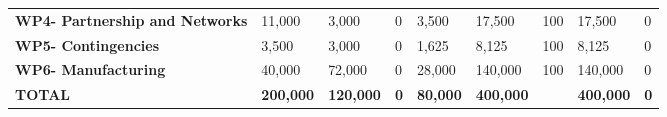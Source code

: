 \begin{table}[H]
{\begin{tabular}{p{5cm}p{2cm}p{2cm}p{2.5cm}p{2cm}p{2cm}p{2cm}p{2cm}p{2cm}}
\textbf{WP4- Partnership and Networks} & 11,000                                                                 & 3,000                                                              & 0                                                                               & 3,500                                                                        & 17,500                                                                                        & 100                          & 17,500                          & 0                                                                         \\
\textbf{WP5- Contingencies}                                                        & 3,500                                                                  & 3,000                                                              & 0                                                                               & 1,625                                                                        & 8,125                                                                                         & 100                          & 8,125                           & 0                                                                         \\
\textbf{WP6- Manufacturing}                                                        & 40,000                                                                 & 72,000                                                             & 0                                                                               & 28,000                                                                       & 140,000                                                                                       & 100                          & 140,000                         & 0                                                                         \\ \hline
\textbf{TOTAL}                                                                     & \textbf{200,000}                                                       & \textbf{120,000}                                                   & \textbf{0}                                                                      & \textbf{80,000}                                                              & \textbf{400,000}                                                                              & \textbf{}                    & \textbf{400,000}                & \textbf{0}                                                               
\\ \bottomrule[2pt]
\end{tabular} }
\end{table}

